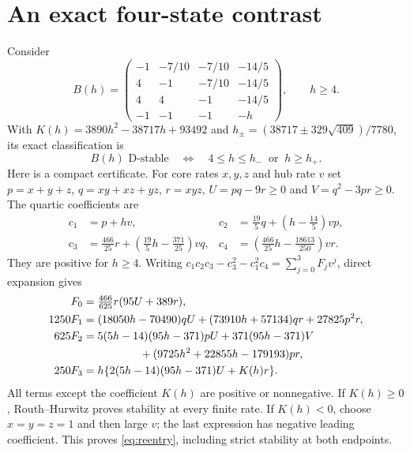 \documentclass[11pt]{article}
\theoremstyle{remark}\newtheorem{remark}[theorem]{Remark}
\begin{document}
\section{An exact four-state contrast}\label{sec:example}
Consider
\[
 B(h)=\begin{pmatrix}
 -1&-7/10&-7/10&-14/5\\
 4&-1&-7/10&-14/5\\
 4&4&-1&-14/5\\
 -1&-1&-1&-h
 \end{pmatrix},\qquad h\ge4.
\]
With $K(h)=3890h^2-38717h+93492$ and
$h_\pm=(38717\pm329\sqrt{409})/7780$, its exact classification is
\begin{equation}\label{eq:reentry}
 B(h)\text{ D-stable}\quad\Longleftrightarrow\quad
 4\le h\le h_-\ \text{ or }\ h\ge h_+.
\end{equation}
Here is a compact certificate. For core rates $x,y,z$ and hub rate $v$ set
$p=x+y+z$, $q=xy+xz+yz$, $r=xyz$, $U=pq-9r\ge0$ and $V=q^2-3pr\ge0$.
The quartic coefficients are
\begin{align*}
 c_1&=p+hv,&c_2&=\tfrac{19}{5}q+(h-\tfrac{14}{5})vp,\\
 c_3&=\tfrac{466}{25}r+(\tfrac{19}{5}h-\tfrac{371}{25})vq,&
 c_4&=(\tfrac{466}{25}h-\tfrac{18613}{250})vr.
\end{align*}
They are positive for $h\ge4$. Writing
$c_1c_2c_3-c_3^2-c_1^2c_4=\sum_{j=0}^3F_jv^j$, direct expansion gives
\begin{align*}
 F_0&=\tfrac{466}{625}r(95U+389r),\\
 1250F_1&=(18050h-70490)qU+(73910h+57134)qr+27825p^2r,\\
 625F_2&=5(5h-14)(95h-371)pU+371(95h-371)V\\
 &\hspace{18mm}+(9725h^2+22855h-179193)pr,\\
 250F_3&=h\{2(5h-14)(95h-371)U+K(h)r\}.
\end{align*}
All terms except the coefficient $K(h)$ are positive or nonnegative.
If $K(h)\ge0$, Routh--Hurwitz proves stability at every finite rate.
If $K(h)<0$, choose $x=y=z=1$ and then large $v$; the last expression
has negative leading coefficient. This proves \eqref{eq:reentry},
including strict stability at both endpoints.
\end{document}
